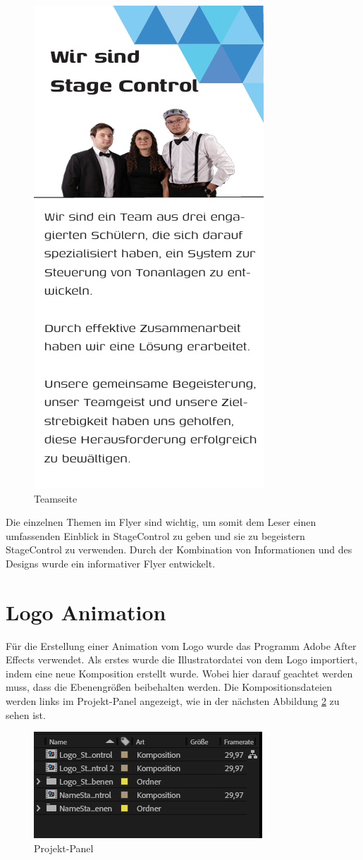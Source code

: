 \begin{figure}[H]
	\centering
	\includegraphics[width=0.5\linewidth]{images/Teamseite.png}
	\caption[Teamseite]{Teamseite}
	\label{fig:Teamseite}
\end{figure} 

Die einzelnen Themen im Flyer sind wichtig, um somit dem Leser einen umfassenden Einblick in StageControl zu geben und sie zu begeistern StageControl zu verwenden. Durch der Kombination von Informationen und des Designs wurde ein informativer Flyer entwickelt. 

\section{Logo Animation}
Für die Erstellung einer Animation vom Logo wurde das Programm Adobe After Effects verwendet. Als erstes wurde die Illustratordatei von dem Logo importiert, indem eine neue Komposition erstellt wurde. Wobei hier darauf geachtet werden muss, dass die Ebenengrößen beibehalten werden. Die Kompositionsdateien werden links im Projekt-Panel angezeigt, wie in der nächsten Abbildung \ref{fig:Projekt-Panel} zu sehen ist.

\begin{figure}[H]
	\centering
	\includegraphics[width=0.5\linewidth]{images/Projekt-Panel.png}
	\caption[Projekt-Panel]{Projekt-Panel}
	\label{fig:Projekt-Panel}
\end{figure} 

